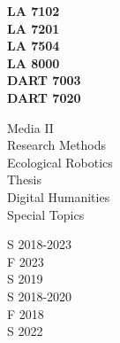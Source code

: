 \documentclass[10pt]{designcv}
\begin{document}
\begin{minipage}[t]{0.13\textwidth}
\textbf{LA 7102}\\
\textbf{LA 7201}\\
\textbf{LA 7504}\\
\textbf{LA 8000}\\
\textbf{DART 7003}\\
\textbf{DART 7020}\\
\end{minipage}
\begin{minipage}[t]{0.21\textwidth}
Media II\\
Research Methods\\
Ecological Robotics\\
Thesis\\
Digital Humanities\\
Special Topics\\
\end{minipage}
\begin{minipage}[t]{0.15\textwidth}
S 2018-2023\\
F 2023\\
S 2019\\
S 2018-2020\\
F 2018\\
S 2022\\
\end{minipage}





\end{document}
